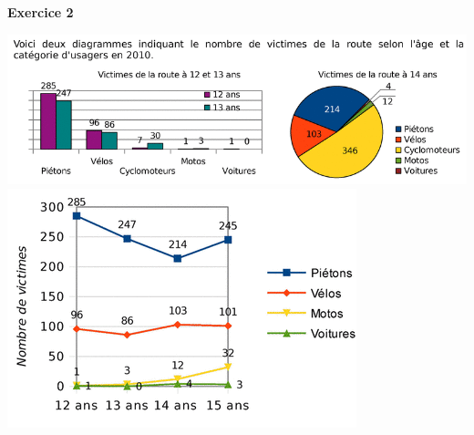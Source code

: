 \documentclass[12pt,a4paper]{article}
\begin{document}
\textbf{Exercice 2}
\begin{center}
\includegraphics[scale=0.42]{img/IE-diagrammes.png} 
\includegraphics[scale=0.42]{img/IE-cart.png}
\end{center}
\end{document}
